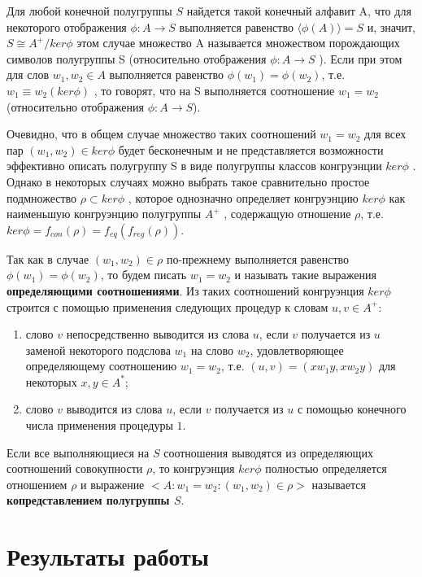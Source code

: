 \documentclass[bachelor, och, labwork]{shiza}
\begin{document}
    Для любой конечной полугруппы $S$ найдется такой конечный алфавит A, что для некоторого отображения $\phi : A
    \rightarrow S$ выполняется равенство $\langle \phi(A) \rangle =S$ и, значит, $S \cong A^+/ ker \phi$ этом случае
    множество A называется множеством порождающих символов полугруппы S (относительно отображения $\phi : A \rightarrow
    S$ ). Если при этом для слов $w_1,w_2 \in A$ выполняется равенство $\phi(w_1) = \phi(w_2)$, т.е. $w_1 \equiv
    w_2(ker\phi)$ , то говорят, что на S выполняется соотношение $w_1 = w_2$ (относительно отображения $\phi : A
    \rightarrow S$).

    Очевидно, что в общем случае множество таких соотношений $w_1 = w_2$ для всех пар $(w_1, w_2) \in ker\phi$ будет
    бесконечным и не представляется возможности эффективно описать полугруппу S в виде полугруппы классов конгруэнции
    $ker\phi$ . Однако в некоторых случаях можно выбрать такое сравнительно простое подмножество $\rho \subset ker\phi$
    , которое однозначно определяет конгруэнцию $ker\phi$ как наименьшую конгруэнцию полугруппы $A^+$ , содержащую
    отношение $\rho$, т.е. $ker\phi = f_{con}(\rho) = f_{eq}(f_{reg}(\rho))$.

    Так как в случае $(w_1, w_2) \in \rho$ по-прежнему выполняется равенство $\phi(w_1) = \phi(w_2)$, то будем писать
    $w_1 = w_2$ и называть такие выражения \textbf{определяющими соотношениями}. Из таких соотношений конгруэнция
    $ker\phi$ строится с помощью применения следующих процедур к словам $u,v \in A^+$:

    \begin{enumerate}
      \item слово $v$ непосредственно выводится из слова $u$, если $v$ получается из $u$ заменой некоторого подслова
      $w_1$ на слово $w_2$, удовлетворяющее определяющему соотношению $w_1 = w_2$, т.е. $(u, v) = (xw_1y, xw_2y)$ для
      некоторых $x, y \in A^*$;
      \item слово $v$ выводится из слова $u$, если $v$ получается из $u$ с помощью конечного числа применения процедуры
      $1$.
    \end{enumerate}
    
    Если все выполняющиеся на $S$ соотношения выводятся из определяющих соотношений совокупности $\rho$, то конгруэнция
    $ker\phi$ полностью определяется отношением $\rho$ и выражение $<A: {w_1 = w_2 : (w_1, w_2) \in \rho}>$ называется
    \textbf{копредставлением полугруппы $S$}.


\section{Результаты работы}
\end{document}
